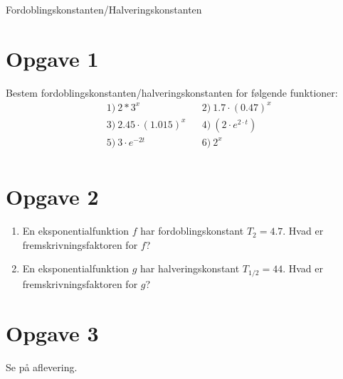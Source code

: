 \begin{center}
\Huge
Fordoblingskonstanten/Halveringskonstanten
\end{center}
\section*{Opgave 1}

Bestem fordoblingskonstanten/halveringskonstanten for følgende funktioner:
\begin{align*}
&1) \ 2*3^x  &&2) \ 1.7\cdot(0.47)^x   \\
&3) \ 2.45\cdot(1.015)^x  &&4) \  (2\cdot e^{2\cdot t})   \\
&5) \ 3\cdot e^{-2t}  &&6) \ 2^x   \\
\end{align*}


\section*{Opgave 2}
\begin{enumerate}[label=\roman*)]
\item En eksponentialfunktion $f$ har fordoblingskonstant $T_2=4.7$. Hvad er fremskrivningsfaktoren for $f$?
\item En eksponentialfunktion $g$ har halveringskonstant $T_{1/2}=44$. Hvad er fremskrivningsfaktoren for $g$? 
\end{enumerate}

\section*{Opgave 3}
Se på aflevering.
